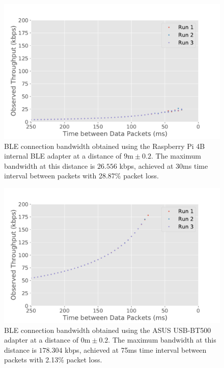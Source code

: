 \begin{figure}[H]
    \centering
    \includegraphics[width=0.75\linewidth]{images/ble-bandwidth-hci1-900cm.pdf}
    \caption[\acs{BLE} connection bandwidth obtained using the ASUS USB-BT500 adapter at a distance of 9m.]{\acs{BLE} connection bandwidth obtained using the Raspberry Pi 4B internal \acs{BLE} adapter at a distance of $9\text{m} \pm 0.2$. The maximum bandwidth at this distance is $26.556$ kbps, achieved at 30ms time interval between packets with 28.87\% packet loss.}
    \label{fig:ble-bandwidth-hci1-9m}
\end{figure}

\begin{figure}[H]
    \centering
    \includegraphics[width=0.75\linewidth]{images/ble-bandwidth-hci0-0cm.pdf}
    \caption[\acs{BLE} connection bandwidth obtained using the ASUS USB-BT500 adapter at a distance of 0m.]{\acs{BLE} connection bandwidth obtained using the ASUS USB-BT500 adapter at a distance of $0\text{m} \pm 0.2$. The maximum bandwidth at this distance is $178.304$ kbps, achieved at 75ms time interval between packets with 2.13\% packet loss.}
    \label{fig:ble-bandwidth-hci0-0m}
\end{figure}

